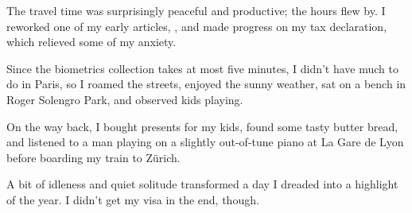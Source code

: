 \documentclass{article}
\begin{document}
The travel time was surprisingly peaceful and productive; the hours flew by.
I reworked one of my early articles, , and made progress on my tax declaration, which relieved some of my anxiety.

Since the biometrics collection takes at most five minutes,
I didn't have much to do in Paris,
so I roamed the streets,
enjoyed the sunny weather,
sat on a bench in Roger Solengro Park,
and observed kids playing.

On the way back,
I bought presents for my kids, found some tasty butter bread, and listened to a man playing on a slightly out-of-tune piano at La Gare de Lyon before boarding my train to Zürich.

A bit of idleness and quiet solitude transformed a day I dreaded into a highlight of the year.
I didn't get my visa in the end, though.
\end{document}
